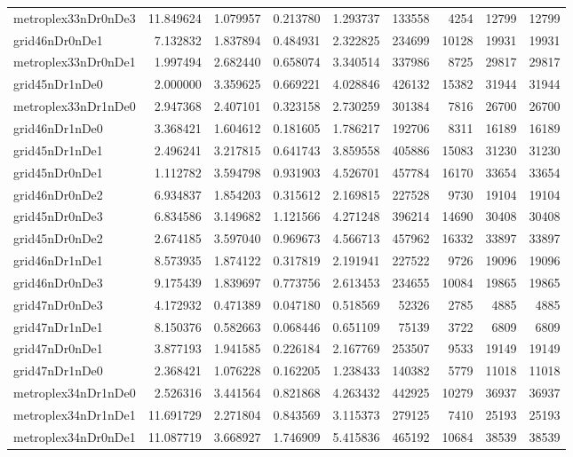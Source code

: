 \begin{longtable}{|l|r|r|r|r|r|r|r|r|}
metroplex33nDr0nDe3 & 11.849624 & 1.079957 & 0.213780 & 1.293737 & 133558 & 4254 & 12799 & 12799 \\
grid46nDr0nDe1 & 7.132832 & 1.837894 & 0.484931 & 2.322825 & 234699 & 10128 & 19931 & 19931 \\
metroplex33nDr0nDe1 & 1.997494 & 2.682440 & 0.658074 & 3.340514 & 337986 & 8725 & 29817 & 29817 \\
grid45nDr1nDe0 & 2.000000 & 3.359625 & 0.669221 & 4.028846 & 426132 & 15382 & 31944 & 31944 \\
metroplex33nDr1nDe0 & 2.947368 & 2.407101 & 0.323158 & 2.730259 & 301384 & 7816 & 26700 & 26700 \\
grid46nDr1nDe0 & 3.368421 & 1.604612 & 0.181605 & 1.786217 & 192706 & 8311 & 16189 & 16189 \\
grid45nDr1nDe1 & 2.496241 & 3.217815 & 0.641743 & 3.859558 & 405886 & 15083 & 31230 & 31230 \\
grid45nDr0nDe1 & 1.112782 & 3.594798 & 0.931903 & 4.526701 & 457784 & 16170 & 33654 & 33654 \\
grid46nDr0nDe2 & 6.934837 & 1.854203 & 0.315612 & 2.169815 & 227528 & 9730 & 19104 & 19104 \\
grid45nDr0nDe3 & 6.834586 & 3.149682 & 1.121566 & 4.271248 & 396214 & 14690 & 30408 & 30408 \\
grid45nDr0nDe2 & 2.674185 & 3.597040 & 0.969673 & 4.566713 & 457962 & 16332 & 33897 & 33897 \\
grid46nDr1nDe1 & 8.573935 & 1.874122 & 0.317819 & 2.191941 & 227522 & 9726 & 19096 & 19096 \\
grid46nDr0nDe3 & 9.175439 & 1.839697 & 0.773756 & 2.613453 & 234655 & 10084 & 19865 & 19865 \\
grid47nDr0nDe3 & 4.172932 & 0.471389 & 0.047180 & 0.518569 & 52326 & 2785 & 4885 & 4885 \\
grid47nDr1nDe1 & 8.150376 & 0.582663 & 0.068446 & 0.651109 & 75139 & 3722 & 6809 & 6809 \\
grid47nDr0nDe1 & 3.877193 & 1.941585 & 0.226184 & 2.167769 & 253507 & 9533 & 19149 & 19149 \\
grid47nDr1nDe0 & 2.368421 & 1.076228 & 0.162205 & 1.238433 & 140382 & 5779 & 11018 & 11018 \\
metroplex34nDr1nDe0 & 2.526316 & 3.441564 & 0.821868 & 4.263432 & 442925 & 10279 & 36937 & 36937 \\
metroplex34nDr1nDe1 & 11.691729 & 2.271804 & 0.843569 & 3.115373 & 279125 & 7410 & 25193 & 25193 \\
metroplex34nDr0nDe1 & 11.087719 & 3.668927 & 1.746909 & 5.415836 & 465192 & 10684 & 38539 & 38539 \\

\end{longtable}
